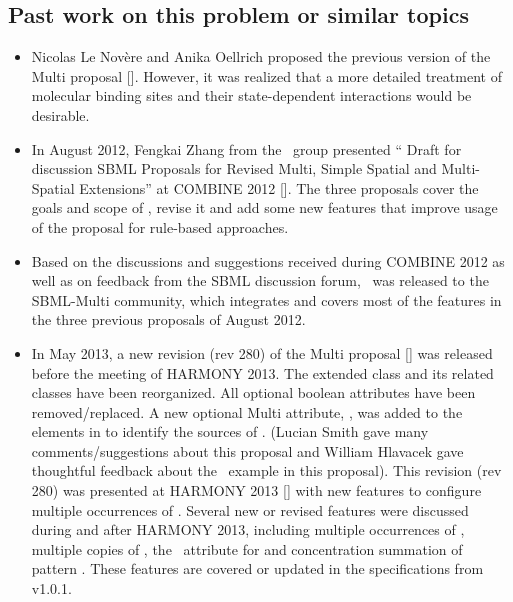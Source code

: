 \subsection{Past work on this problem or similar topics}
\label{def:Past_work}

\begin{itemize}
 \item 
  Nicolas Le Nov\`ere and Anika Oellrich proposed the previous version of the Multi proposal [\cite{ref:multi1}]. However, it was realized that a more detailed treatment of molecular binding sites and their state-dependent interactions would be desirable.
 
 \item In August 2012, Fengkai Zhang from the \Simmune\ group presented `` Draft for discussion SBML Proposals for Revised Multi, Simple Spatial and Multi-Spatial Extensions'' at COMBINE 2012 [\cite{ref:revisedMulti}]. The three proposals cover the goals and scope of \multiOneProposal, revise it and add some new features that improve usage of the proposal for rule-based approaches.
 
 \item Based on the discussions and suggestions received during COMBINE 2012 as well as on feedback from the SBML discussion forum, \multiTwoProposalVerTwo\ was released to the SBML-Multi community, which integrates and covers most of the features in the three previous proposals of August 2012. 
 
 \item In May 2013, a new revision (rev 280) of the Multi proposal [\cite{ref:multiproposal280}] was released before the meeting of HARMONY 2013. The extended \ExCompartment class and its related classes have been reorganized. All optional boolean attributes have been removed/replaced. A new optional Multi attribute, , was added to the  elements in  to identify  the sources of \species. (Lucian Smith gave many comments/suggestions about this proposal and William Hlavacek gave thoughtful feedback about the \BioNetGen\ example in this proposal). This revision (rev 280) was presented at HARMONY 2013  [\cite{ref:harmony2013}] with new features to configure multiple occurrences of \SpeciesFeatureType. Several new or revised features were discussed during and after HARMONY 2013, including multiple occurrences of \SpeciesFeatureType, multiple copies of \SpeciesTypeInstance, the \numericValueAtt\ attribute for \PossibleSpeciesFeatureValue and concentration summation of pattern \species. These features are covered or updated in the specifications from v1.0.1.
  
\end{itemize}

